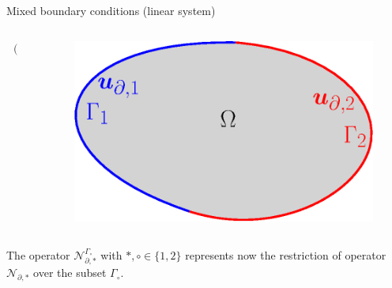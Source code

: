 \documentclass[aspectratio=169]{ISAE-Beamer}
\begin{document}
\begin{frame}{Mixed boundary conditions (linear system)}
\begin{columns}
\begin{column}{0.6\textwidth}
\begin{align*}
\begin{pmatrix}
\end{pmatrix}.
\end{align*}
\end{column}
\begin{column}{0.4\textwidth}
\begin{figure}[tb]
	\centering
	\includegraphics[width=0.9\columnwidth]{part_3/pfem/bound_part.eps}
\end{figure}
\end{column}
\end{columns}

\vspace{1cm}
The operator $\mathcal{N}_{\partial, *}^{\Gamma_\circ}$ with $*, \circ \in \{1, 2\}$ represents now the restriction of operator $\mathcal{N}_{\partial, *}$ over the subset $\Gamma_\circ$.
\end{frame}
\end{document}
